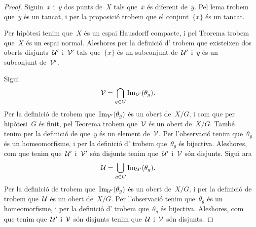 \documentclass[../../main.tex]{subfiles}
\begin{document}
    \begin{proof} %
        Siguin~\(x\) i~\(y\) dos punts de~\(X\) tals que~\(\overline{x}\) és diferent de~\(\overline{y}\).
        Pel lema  trobem que~\(\overline{y}\) és un tancat, i per la proposició  trobem que el conjunt~\(\{x\}\) és un tancat.

        Per hipòtesi tenim que~\(X\) és un espai Hausdorff compacte, i pel Teorema  trobem que~\(X\) és un espai normal.
        Aleshores per la definició d' trobem que existeixen dos oberts disjunts~\(\mathcal{U}'\) i~\(\mathcal{V}'\) tals que~\(\{x\}\) és un subconjunt de~\(\mathcal{U}'\) i~\(\overline{y}\) és un subconjunt de~\(\mathcal{V}'\).

        Sigui
        \[
            \mathcal{V}=\bigcap_{g\in G}\operatorname{Im}_{\mathcal{V}'}(\theta_{g}).
        \]
        Per la definició de  trobem que~\(\operatorname{Im}_{\mathcal{V}'}(\theta_{g})\) és un obert de~\(X/G\), i com que per hipòtesi~\(G\) és finit, pel Teorema  trobem que~\(\mathcal{V}\) és un obert de~\(X/G\).
        També tenim per la definició de  que~\(\overline{y}\) és un element de~\(\mathcal{V}\).
        Per l'observació  tenim que~\(\theta_{g}\) és un homeomorfisme, i per la definició d' trobem que~\(\theta_{g}\) és bijectiva.
        Aleshores, com que tenim que~\(\mathcal{U}'\) i~\(\mathcal{V}'\) són disjunts tenim que~\(\mathcal{U}'\) i~\(\mathcal{V}\) són disjunts.
        Sigui ara
        \[
            \mathcal{U}=\bigcup_{g\in G}\operatorname{Im}_{\mathcal{U}'}(\theta_{g}).
        \]
        Per la definició de  trobem que~\(\operatorname{Im}_{\mathcal{U}'}(\theta_{g})\) és un obert de~\(X/G\), i per la definició de  trobem que~\(\mathcal{U}\) és un obert de~\(X/G\).
        Per l'observació  tenim que~\(\theta_{g}\) és un homeomorfisme, i per la definició d' trobem que~\(\theta_{g}\) és bijectiva.
        Aleshores, com que tenim que~\(\mathcal{U}'\) i~\(\mathcal{V}\) són disjunts tenim que~\(\mathcal{U}\) i~\(\mathcal{V}\) són disjunts.


\end{proof}
\end{document}
